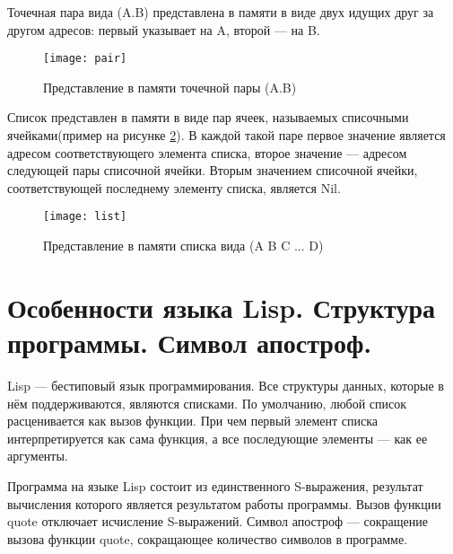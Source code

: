 \documentclass[a4paper, 14pt, unknownkeysallowed]{extreport}
\begin{document}
Точечная пара вида (A.B) представлена в памяти в виде двух идущих друг за другом адресов: первый указывает на A, второй --- на B.

\begin{figure}[!ht]
	\texttt{[image: pair]}
	\caption{Представление в памяти точечной пары (A.B)}
	\label{fig:pair}
\end{figure}

Список представлен в памяти в виде пар ячеек, называемых списочными ячейками(пример на рисунке \ref{fig:list}). В каждой такой паре первое значение является адресом соответствующего элемента списка, второе значение --- адресом следующей пары списочной ячейки. Вторым значением списочной ячейки, соответствующей последнему элементу списка, является Nil. 

\begin{figure}[!ht]
	\texttt{[image: list]}
	\caption{Представление в памяти списка вида (A B C ... D)}
	\label{fig:list}
\end{figure}

\section{Особенности языка Lisp. Структура программы. Символ апостроф.}
Lisp --- бестиповый язык программирования. Все структуры данных, которые в нём поддерживаются, являются списками. По умолчанию, любой список расценивается как вызов функции. При чем первый элемент списка интерпретируется как сама функция, а все последующие элементы --- как ее аргументы.

Программа на языке Lisp состоит из единственного S-выражения, результат вычисления которого является результатом работы программы. Вызов функции quote отключает исчисление S-выражений. Символ апостроф --- сокращение вызова функции quote, сокращающее количество символов в программе.
\end{document}
